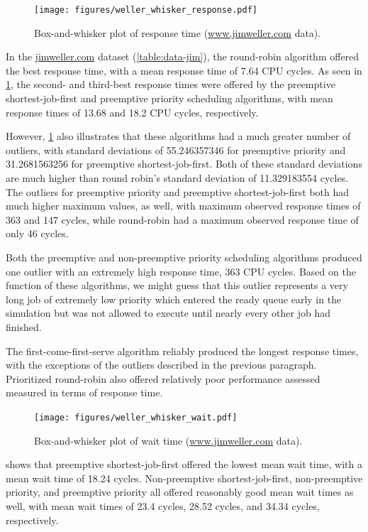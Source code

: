 \documentclass[12pt,letterpaper]{article}
\begin{document}
	  	  	\begin{figure}[H]
				\centerline{\texttt{[image: figures/weller\_whisker\_response.pdf]}}
				\caption{Box-and-whisker plot of response time (\url{www.jimweller.com} data).}
				\label{fig:jim_whisker_response}
			\end{figure}

	  			In the \url{jimweller.com} dataset (\cref{table:data-jim}), the round-robin algorithm offered the best response time, with a mean response time of 7.64 CPU cycles. As seen in \cref{fig:jim_whisker_response}, the second- and third-best response times were offered by the preemptive shortest-job-first and preemptive priority scheduling algorithms, with mean response times of 13.68 and 18.2 CPU cycles, respectively. 

	  			However, \cref{fig:jim_whisker_response} also illustrates that these algorithms had a much greater number of outliers, with standard deviations of 55.246357346 for preemptive priority and 31.2681563256 for preemptive shortest-job-first. Both of these standard deviations are much higher than round robin's standard deviation of 11.329183554 cycles. The outliers for preemptive priority and preemptive shortest-job-first both had much higher maximum values, as well, with maximum observed response times of 363 and 147 cycles, while round-robin had a maximum observed response time of only 46 cycles. 

	  			Both the preemptive and non-preemptive priority scheduling algorithms produced one outlier with an extremely high response time, 363 CPU cycles. Based on the function of these algorithms, we might guess that this outlier represents a very long job of extremely low priority which entered the ready queue early in the simulation but was not allowed to execute until nearly every other job had finished.

	  			The first-come-first-serve algorithm reliably produced the longest response times, with the exceptions of the outliers described in the previous paragraph. Prioritized round-robin also offered relatively poor performance assessed measured in terms of response time.

			\begin{figure}[H]
				\centerline{\texttt{[image: figures/weller\_whisker\_wait.pdf]}}
				\caption{Box-and-whisker plot of wait time (\url{www.jimweller.com} data).}
				\label{fig:jim_whisker_wait}
			\end{figure}

			 shows that preemptive shortest-job-first offered the lowest mean wait time, with a mean wait time of 18.24 cycles. Non-preemptive shortest-job-first, non-preemptive priority, and preemptive priority all offered reasonably good mean wait times as well, with mean wait times of 23.4 cycles, 28.52 cycles, and 34.34 cycles, respectively.
\end{document}
